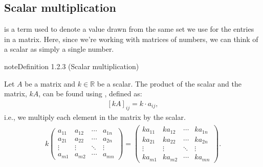 \documentclass[letterpaper,10pt,english]{jupyterBook}
\begin{document}
\subsection{Scalar multiplication}
\label{\detokenize{_pages/1.1_Matrix_operations:scalar-multiplication}}\label{\detokenize{_pages/1.1_Matrix_operations:index-2}}
\sphinxAtStartPar
{} is a term used to denote a value drawn from the same set we use for the entries in a matrix. Here, since we’re working with matrices of numbers, we can think of a scalar as simply a single number.
\label{_pages/1.1_Matrix_operations:scalar-multiplication-definition}
\begin{sphinxadmonition}{note}{Definition 1.2.3 (Scalar multiplication)}



\sphinxAtStartPar
Let \(A\) be a matrix and \(k \in \mathbb{R}\) be a scalar. The product of the scalar and the matrix, \(kA\), can be found using , defined as:
\begin{equation}\label{equation:_pages/1.1_Matrix_operations:matrix-scalar-multiplication-equation}
\begin{split} [kA]_{ij} = k\cdot a_{ij}, \end{split}
\end{equation}
\sphinxAtStartPar
i.e., we multiply each element in the matrix by the scalar.
\begin{equation*}
\begin{split} \begin{align*}
    k
    \begin{pmatrix}
        a_{11} & a_{12} & \cdots & a_{1n} \\
        a_{21} & a_{22} & \cdots & a_{2n} \\
        \vdots & \vdots & \ddots & \vdots \\
        a_{m1} & a_{m2} & \cdots & a_{mn}
    \end{pmatrix} =
    \begin{pmatrix}
        ka_{11} & ka_{12} & \cdots & ka_{1n} \\
        ka_{21} & ka_{22} & \cdots & ka_{2n} \\
        \vdots & \vdots & \ddots & \vdots \\
        ka_{m1} & ka_{m2} & \cdots & ka_{mn}
    \end{pmatrix}.
\end{align*} \end{split}
\end{equation*}\end{sphinxadmonition}
\end{document}

